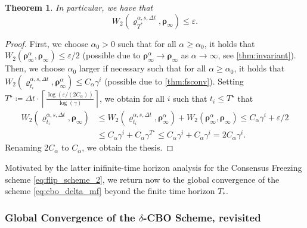 \documentclass[reqno]{amsart}
\numberwithin{algorithm}{section}
\newtheorem{theorem}{Theorem}[section]
\begin{document}
{{\begin{theorem}
    In particular, we have that
    \begin{equation}
        W_2(\varrho_{T^*}^{\alpha,s,\Delta t}, \boldsymbol\rho_\infty) \leq \varepsilon.
    \end{equation}
\end{theorem}
\begin{proof}
First, we choose $\alpha_0 > 0$ such that for all $\alpha \geq \alpha_0$, it holds that $W_2(\boldsymbol\rho_\infty^\alpha, \boldsymbol\rho_\infty) \leq \varepsilon/2$ (possible due to $\boldsymbol\rho_\infty^\alpha \to \boldsymbol\rho_\infty$ as $\alpha \to \infty$, see \cref{thm:invariant}). Then, we choose $\alpha_0$ larger if necessary such that for all $\alpha \geq \alpha_0$, it holds that $W_2(\varrho_{t_i}^{\alpha,s,\Delta t}, \boldsymbol\rho_\infty^\alpha) \leq C_\alpha \gamma^i$ (possible due to \cref{thm:fsconv}). Setting $T^\star \coloneqq \Delta t \cdot \left\lceil\frac{\log(\varepsilon/(2C_\alpha))}{\log(\gamma)}\right\rceil$, we obtain for all $i$ such that $t_i \leq T^\star$ that
\begin{equation}
    \begin{split}
        W_2(\varrho_{t_i}^{\alpha,s,\Delta t}, \boldsymbol\rho_\infty) &\leq W_2(\varrho_{t_i}^{\alpha,s,\Delta t}, \boldsymbol\rho_\infty^\alpha) + W_2(\boldsymbol\rho_\infty^\alpha, \boldsymbol\rho_\infty) \leq C_\alpha \gamma^i + \varepsilon/2 \\&\leq C_\alpha \gamma^i + C_\alpha \gamma^{T^\star} \leq C_\alpha \gamma^i + C_\alpha \gamma^i = 2 C_\alpha \gamma^i.
    \end{split}
\end{equation}
Renaming $2C_\alpha$ to $C_\alpha$, we obtain the thesis.
\end{proof}
}

Motivated by the latter inifinite-time horizon analysis for the Consensus Freezing scheme \eqref{eq:flip_scheme_2}, we return now to the global convergence of the scheme \eqref{eq:cbo_delta_mf} beyond the finite time horizon $T_*$.

\subsubsection{ Global Convergence of the \texorpdfstring{$\delta$-CBO}{delta-CBO} Scheme, revisited}\label{sec:delta_CBO2}

}
\end{document}
